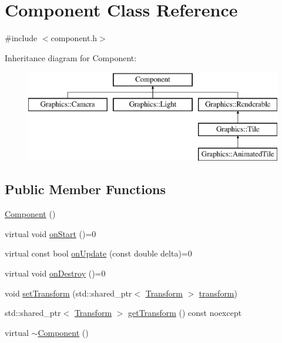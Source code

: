\hypertarget{class_component}{}\section{Component Class Reference}
\label{class_component}


{\ttfamily \#include $<$component.\+h$>$}

Inheritance diagram for Component\+:\begin{figure}[H]
\begin{center}
\leavevmode
\includegraphics[height=4.000000cm]{class_component}
\end{center}
\end{figure}
\subsection*{Public Member Functions}
\begin{DoxyCompactItemize}
\item 
\hyperlink{class_component_a8775db6d1a2c1afc2e77cd3c8f39da6f}{Component} ()
\item 
virtual void \hyperlink{class_component_a4a528a8790dbc141ffd0aba638b6dcc4}{on\+Start} ()=0
\item 
virtual const bool \hyperlink{class_component_a8be284fccf4e97cee6705bd2d8f3705e}{on\+Update} (const double delta)=0
\item 
virtual void \hyperlink{class_component_a2b198f27162a6caf63917e304295f892}{on\+Destroy} ()=0
\item 
void \hyperlink{class_component_a8842d3ce36b584a3e7d0cb7734232812}{set\+Transform} (std\+::shared\+\_\+ptr$<$ \hyperlink{class_transform}{Transform} $>$ \hyperlink{class_component_a02b1c70de1d9e2c6499dff349da1b0ff}{transform})
\item 
std\+::shared\+\_\+ptr$<$ \hyperlink{class_transform}{Transform} $>$ \hyperlink{class_component_a94dfec102ece6b669176f0609b0a5497}{get\+Transform} () const noexcept
\item 
virtual \hyperlink{class_component_a2e9aa4348314d981f05f67397ad2f872}{$\sim$\+Component} ()
\end{DoxyCompactItemize}
